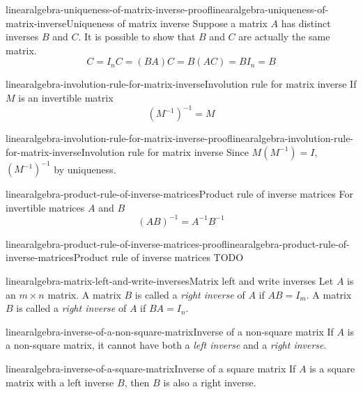 \documentclass[preview]{standalone}
\begin{document}
\begin{snippetproof}{linearalgebra-uniqueness-of-matrix-inverse-proof}{linearalgebra-uniqueness-of-matrix-inverse}{Uniqueness of matrix inverse}
    Suppose a matrix \(A\) has distinct inverses \(B\)
    and \(C\).
    It is possible to show that \(B\) and \(C\) are actually
    the same matrix.
    \[
        C=I_n C = (BA) C = B (AC) = BI_n = B
    \]
\end{snippetproof}

\begin{snippetproposition}{linearalgebra-involution-rule-for-matrix-inverse}{Involution rule for matrix inverse}
    If \(M\) is an invertible matrix
    \[
        {(M^{-1})}^{-1} = M
    \]
\end{snippetproposition}

\begin{snippetproof}{linearalgebra-involution-rule-for-matrix-inverse-proof}{linearalgebra-involution-rule-for-matrix-inverse}{Involution rule for matrix inverse}
    Since \(M(M^{-1}) = I\), \({(M^{-1})}^{-1}\)
    by uniqueness. %
\end{snippetproof}

\begin{snippetproposition}{linearalgebra-product-rule-of-inverse-matrices}{Product rule of inverse matrices}
    For invertible matrices \(A\) and \(B\)
    \[
        {(AB)}^{-1} = A^{-1} B^{-1}
    \]
\end{snippetproposition}

\begin{snippetproof}{linearalgebra-product-rule-of-inverse-matrices-proof}{linearalgebra-product-rule-of-inverse-matrices}{Product rule of inverse matrices}
    TODO
\end{snippetproof}

\begin{snippetdefinition}{linearalgebra-matrix-left-and-write-inverses}{Matrix left and write inverses}
    Let \(A\) is an \(m \times n\) matrix. A matrix \(B\)
    is called a \textit{right inverse} of \(A\)
    if \(AB=I_m\).
    A matrix \(B\) is called a \textit{right inverse} of \(A\)
    if \(BA=I_n\).
\end{snippetdefinition}

\begin{snippetproposition}{linearalgebra-inverse-of-a-non-square-matrix}{Inverse of a non-square matrix}
    If \(A\) is a non-square matrix, it cannot have
    both a \textit{left inverse} and a \textit{right inverse}.
\end{snippetproposition}

\begin{snippetproposition}{linearalgebra-inverse-of-a-square-matrix}{Inverse of a square matrix}
    If \(A\) is a square matrix
    with a left inverse \(B\),
    then \(B\) is also a right inverse.
\end{snippetproposition}
\end{document}
